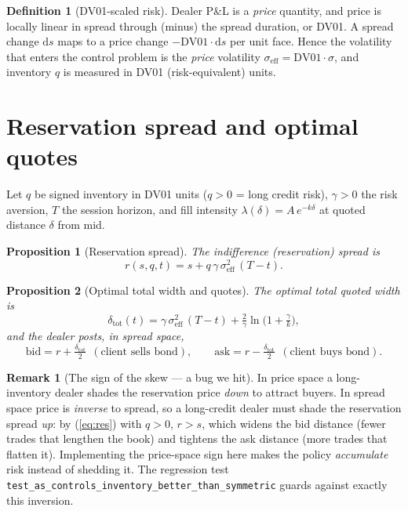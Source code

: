 \documentclass[11pt]{article}
\theoremstyle{definition}
\newtheorem{definition}{Definition}
\newtheorem{remark}{Remark}
\theoremstyle{plain}
\newtheorem{proposition}{Proposition}
\newcommand{\dd}{\mathrm{d}}
\begin{document}
\begin{definition}[DV01-scaled risk]
Dealer P\&L is a \emph{price} quantity, and price is locally linear in spread
through (minus) the spread duration, or DV01. A spread change $\dd s$ maps to a
price change $-\text{DV01}\cdot \dd s$ per unit face. Hence the volatility that
enters the control problem is the \emph{price} volatility
$\sigma_{\text{eff}}=\text{DV01}\cdot\sigma$, and inventory $q$ is measured in
DV01 (risk-equivalent) units.
\end{definition}

\section{Reservation spread and optimal quotes}
\label{sec:quotes}

Let $q$ be signed inventory in DV01 units ($q>0$ = long credit risk),
$\gamma>0$ the risk aversion, $T$ the session horizon, and fill intensity
$\lambda(\delta)=A\,e^{-k\delta}$ at quoted distance $\delta$ from mid.

\begin{proposition}[Reservation spread]
The indifference (reservation) spread is
\begin{equation}
r(s,q,t)=s+q\,\gamma\,\sigma_{\text{eff}}^2\,(T-t).
\label{eq:res}
\end{equation}
\end{proposition}

\begin{proposition}[Optimal total width and quotes]
The optimal total quoted width is
\begin{equation}
\delta_{\text{tot}}(t)=\gamma\,\sigma_{\text{eff}}^2\,(T-t)
+\tfrac{2}{\gamma}\ln\!\big(1+\tfrac{\gamma}{k}\big),
\label{eq:width}
\end{equation}
and the dealer posts, in spread space,
\begin{equation}
\text{bid}=r+\tfrac{\delta_{\text{tot}}}{2}\ \ (\text{client sells bond}),
\qquad
\text{ask}=r-\tfrac{\delta_{\text{tot}}}{2}\ \ (\text{client buys bond}).
\label{eq:quotes}
\end{equation}
\end{proposition}

\begin{remark}[The sign of the skew --- a bug we hit]
\label{rem:sign}
In price space a long-inventory dealer shades the reservation price \emph{down}
to attract buyers. In spread space price is \emph{inverse} to spread, so a
long-credit dealer must shade the reservation spread \emph{up}: by
(\ref{eq:res}) with $q>0$, $r>s$, which widens the bid distance (fewer trades
that lengthen the book) and tightens the ask distance (more trades that flatten
it). Implementing the price-space sign here makes the policy \emph{accumulate}
risk instead of shedding it. The regression test
\texttt{test\_as\_controls\_inventory\_better\_than\_symmetric} guards against
exactly this inversion.
\end{remark}
\end{document}
